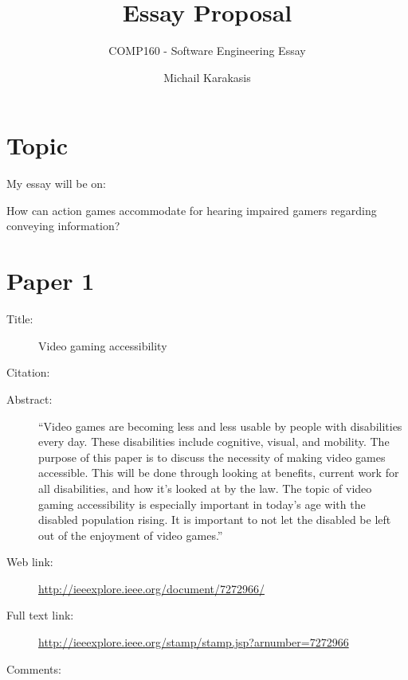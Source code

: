 \documentclass{scrartcl}
\title{Essay Proposal}
\subtitle{COMP160 - Software Engineering Essay}
\author{Michail Karakasis}
\begin{document}
\maketitle

\section*{Topic}

My essay will be on:

How can action games accommodate for hearing impaired gamers regarding conveying information?

\section*{Paper 1}
\begin{description}
\item[Title:] Video gaming accessibility
\item[Citation:] \cite{McPheron}
\item[Abstract:] ``Video games are becoming less and less usable by people with disabilities every day. These disabilities include cognitive, visual, and mobility. The purpose of this paper is to discuss the necessity of making video games accessible. This will be done through looking at benefits, current work for all disabilities, and how it's looked at by the law. The topic of video gaming accessibility is especially important in today's age with the disabled population rising. It is important to not let the disabled be left out of the enjoyment of video games.''
\item[Web link:] \url {http://ieeexplore.ieee.org/document/7272966/}
\item[Full text link:] \url {http://ieeexplore.ieee.org/stamp/stamp.jsp?arnumber=7272966}
\item[Comments:] 
\end{description}
\end{document}
